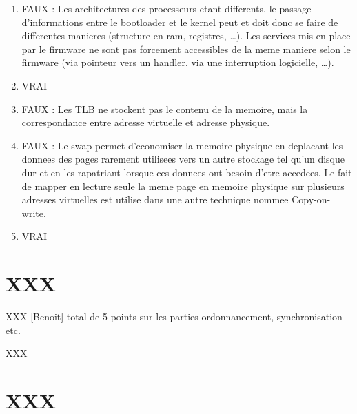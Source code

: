 \begin{correction}

\begin{enumerate}

\item FAUX : Les architectures des processeurs etant differents, le passage d'informations entre le bootloader et le kernel peut et doit donc se faire de differentes manieres (structure en ram, registres, \ldots). Les services mis en place par le firmware ne sont pas forcement accessibles de la meme maniere selon le firmware (via pointeur vers un handler, via une interruption logicielle, \ldots).

\item VRAI

\item FAUX : Les TLB ne stockent pas le contenu de la memoire, mais la correspondance entre adresse virtuelle et adresse physique.

\item FAUX : Le swap permet d'economiser la memoire physique en deplacant les donnees des pages rarement utilisees vers un autre stockage tel qu'un disque dur et en les rapatriant lorsque ces donnees ont besoin d'etre accedees. Le fait de mapper en lecture seule la meme page en memoire physique sur plusieurs adresses virtuelles est utilise dans une autre technique nommee Copy-on-write.

\item VRAI

\end{enumerate}

\end{correction}

%
%

\section{XXX
         {\hfill{} }}

XXX [Benoit] total de 5 points sur les parties ordonnancement, synchronisation
             etc.

\begin{correction}

XXX

\end{correction}

%
%

\section{XXX
         }

